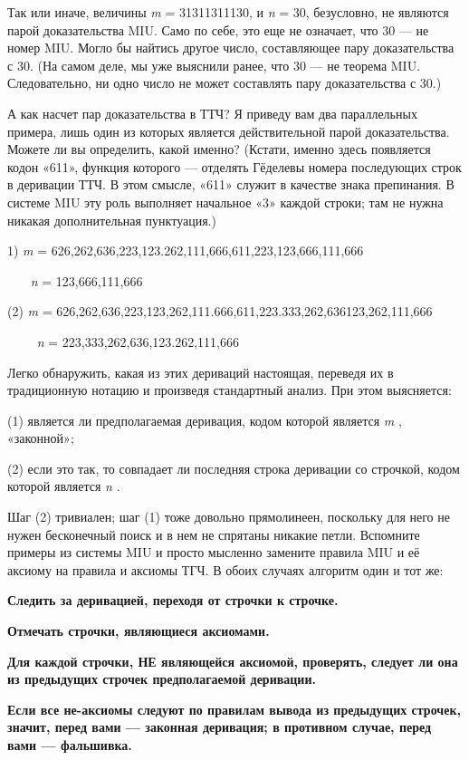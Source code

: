 \documentclass[../main.tex]{subfiles}
\begin{document}
Так или иначе, величины \emph{m} = 31311311130, и \emph{n} = 30, безусловно, не являются парой доказательства MIU. Само по себе, это еще не означает, что 30 --- не номер MIU. Могло бы найтись другое число, составляющее пару доказательства с 30. (На самом деле, мы уже выяснили ранее, что 30 --- не теорема MIU. Следовательно, ни одно число не может составлять пару доказательства с 30.)

А как насчет пар доказательства в ТТЧ? Я приведу вам два параллельных примера, лишь один из которых является действительной парой доказательства. Можете ли вы определить, какой именно? (Кстати, именно здесь появляется кодон «611», функция которого --- отделять Гёделевы номера последующих строк в деривации ТТЧ. В этом смысле, «611» служит в качестве знака препинания. В системе MIU эту роль выполняет начальное «3» каждой строки; там не нужна никакая дополнительная пунктуация.)

1) \emph{m} = 626,262,636,223,123.262,111,666,611,223,123,666,111,666

~~~ \emph{n} = 123,666,111,666

(2) \emph{m} = 626,262,636,223,123,262,111.666,611,223.333,262,636123,262,111,666

~~~~ \emph{n} = 223,333,262,636,123.262,111,666

Легко обнаружить, какая из этих дериваций настоящая, переведя их в традиционную нотацию и произведя стандартный анализ. При этом выясняется:

(1) является ли предполагаемая деривация, кодом которой является \emph{m} , «законной»;

(2) если это так, то совпадает ли последняя строка деривации со строчкой, кодом которой является \emph{n} .

Шаг (2) тривиален; шаг (1) тоже довольно прямолинеен, поскольку для него не нужен бесконечный поиск и в нем не спрятаны никакие петли. Вспомните примеры из системы MIU и просто мысленно замените правила MIU и её аксиому на правила и аксиомы ТГЧ. В обоих случаях алгоритм один и тот же:

\textbf{Следить за деривацией, переходя от строчки к строчке.}

\textbf{Отмечать строчки, являющиеся аксиомами.}

\textbf{Для каждой строчки, НЕ являющейся аксиомой, проверять, следует ли она из предыдущих строчек предполагаемой деривации.}

\textbf{Если все не-аксиомы следуют по правилам вывода из предыдущих строчек, значит, перед вами --- законная деривация; в противном случае, перед вами --- фальшивка.}
\end{document}
